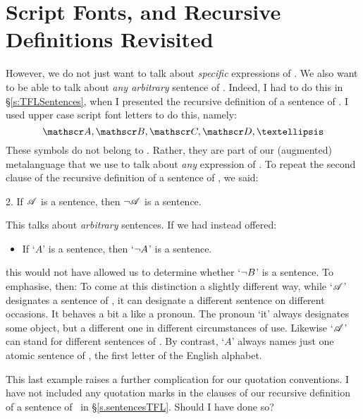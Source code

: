 \section{Script Fonts, and Recursive Definitions Revisited}
However, we do not just want to talk about \emph{specific} expressions of \TFL. We also want to be able to talk about \emph{any arbitrary} sentence of \TFL. Indeed, I had to do this in §\ref{s:TFLSentences}, when I presented the recursive definition of a sentence of \TFL. I used upper case script font letters to do this, namely:
	$$\meta{A}, \meta{B}, \meta{C}, \meta{D}, …$$
These symbols do not belong to \TFL. Rather, they are part of our (augmented) metalanguage that we use to talk about \emph{any} expression of \TFL. To repeat the second clause of the recursive definition of a sentence of \TFL, we said:
	\begin{earg}
		\item[2.] If $\mathscr{A}$ is a sentence, then $\neg \mathscr{A}$ is a sentence.
	\end{earg}
This talks about \emph{arbitrary} sentences. If we had instead offered:
	\begin{itemize}
		\item If `$A$' is a sentence, then `$\neg A$' is a sentence.
	\end{itemize}
this would not have allowed us to determine whether `$\neg B$' is a sentence. To emphasise, then:
To come at this distinction a slightly different way, while `$\mathscr{A}$' designates a sentence of \TFL, it can designate a different sentence on different occasions. It behaves a bit a like a pronoun. The pronoun `it' always designates some object, but a different one in different circumstances of use. Likewise `$\mathscr{A}$' can stand for different sentences of \TFL.  By contrast, `$A$' always names just one atomic sentence of \TFL, the first letter of the English alphabet.

This last example raises a further complication for our quotation conventions. I have not included any quotation marks in the clauses of our recursive definition of a sentence of \TFL\ in §\ref{s.sentencesTFL}. Should I have done so?

